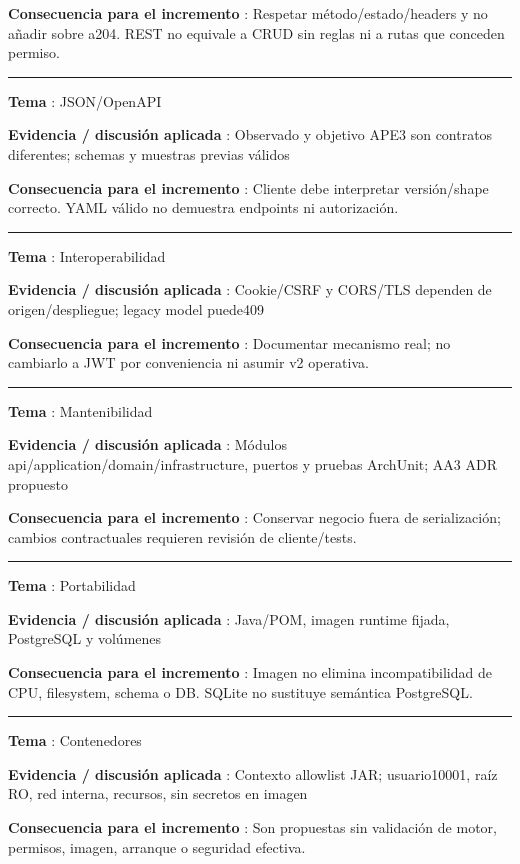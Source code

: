 \documentclass[12pt,a4paper]{report}
\begin{document}
\textbf{Consecuencia para el incremento }: Respetar
método/estado/headers y no añadir sobre a204. REST no equivale a CRUD
sin reglas ni a rutas que conceden permiso.

\medskip\hrule\medskip

\textbf{Tema }: JSON/OpenAPI

\textbf{Evidencia / discusión aplicada }: Observado y objetivo APE3 son
contratos diferentes; schemas y muestras previas válidos

\textbf{Consecuencia para el incremento }: Cliente debe interpretar
versión/shape correcto. YAML válido no demuestra endpoints ni
autorización.

\medskip\hrule\medskip

\textbf{Tema }: Interoperabilidad

\textbf{Evidencia / discusión aplicada }: Cookie/CSRF y CORS/TLS
dependen de origen/despliegue; legacy model puede409

\textbf{Consecuencia para el incremento }: Documentar mecanismo real; no
cambiarlo a JWT por conveniencia ni asumir v2 operativa.

\medskip\hrule\medskip

\textbf{Tema }: Mantenibilidad

\textbf{Evidencia / discusión aplicada }: Módulos
api/application/domain/infrastructure, puertos y pruebas ArchUnit; AA3
ADR propuesto

\textbf{Consecuencia para el incremento }: Conservar negocio fuera de
serialización; cambios contractuales requieren revisión de
cliente/tests.

\medskip\hrule\medskip

\textbf{Tema }: Portabilidad

\textbf{Evidencia / discusión aplicada }: Java/POM, imagen runtime
fijada, PostgreSQL y volúmenes

\textbf{Consecuencia para el incremento }: Imagen no elimina
incompatibilidad de CPU, filesystem, schema o DB. SQLite no sustituye
semántica PostgreSQL.

\medskip\hrule\medskip

\textbf{Tema }: Contenedores

\textbf{Evidencia / discusión aplicada }: Contexto allowlist JAR;
usuario10001, raíz RO, red interna, recursos, sin secretos en imagen

\textbf{Consecuencia para el incremento }: Son propuestas sin validación
de motor, permisos, imagen, arranque o seguridad efectiva.
\end{document}

